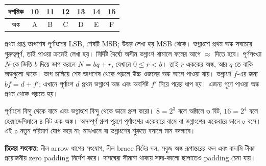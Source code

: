 \begin{center}\begin{tabular}{|c|c|c|c|c|c|c|}\hline
দশমিক&10&11&12&13&14&15\\\hline
অঙ্ক&A&B&C&D&E&F\\\hline
\end{tabular}\end{center}
প্রথম প্রাপ্ত ভাগশেষ পূর্ণাংশের LSB, শেষটি MSB; উত্তর লেখা হয় MSB থেকে। ভগ্নাংশে প্রথম অঙ্ক সবচেয়ে গুরুত্বপূর্ণ, তাই পাওয়া ক্রমেই লেখা হয়। নির্দিষ্ট দৈর্ঘ্যে অসীম ভগ্নাংশ থামালে ফলের আগে $\approx$ দিতে হবে।
পূর্ণসংখ্যা $N$-কে ভিত্তি $b$ দিয়ে ভাগ করলে $N=bq+r$, যেখানে $0\le r<b$। তাই $r$ এককের অঙ্ক, আর $q$-তে বাকি অঙ্কগুলো থাকে। ভাগ চালিয়ে শেষ ভাগশেষ থেকে পড়লে উচ্চ ওজনের অঙ্ক আগে পাওয়া যায়। ভগ্নাংশ $f$-এর জন্য $bf=d+f'$; এখানে পূর্ণাংশ $d$ প্রথম ভগ্নাংশ অঙ্ক এবং অবশিষ্ট $f'$ নিয়ে পরের ধাপ হয়। এজন্য গুণে পাওয়া অঙ্ক প্রথম থেকে পড়তে হয়।

পূর্ণাংশে বিন্দু থেকে বামে এবং ভগ্নাংশে বিন্দু থেকে ডানে গ্রুপ করো। $8=2^3$ বলে অক্টালে ৩ বিট, $16=2^4$ বলে হেক্সাডেসিমালে ৪ বিট এক অঙ্ক। অসম্পূর্ণ গ্রুপ পূরণে পূর্ণাংশের একেবারে বামে বা ভগ্নাংশের একেবারে ডানে ০ বসে। এই ০ নতুন পরিমাণ যোগ করে না; মাঝখানে বা ভগ্নাংশের শুরুতে বসালে মান বদলাবে।

\textbf{চিত্রের সংকেত:} নীল arrow ধাপের সংযোগ, নীল brace বিটের দল, সবুজ অঙ্ক রূপান্তরের ফল এবং বাদামি টীকা প্রয়োজনীয় zero padding নির্দেশ করে। দাগঘেরা সীমানা থাকায় সাদা-কালো ছাপাতেও padding চেনা যায়।














